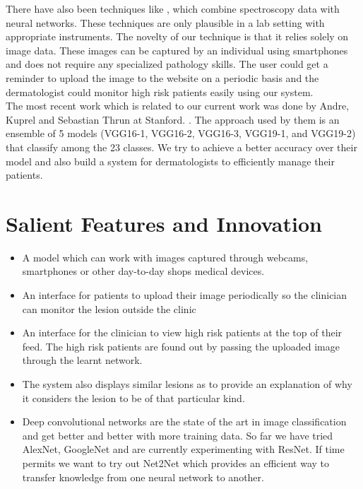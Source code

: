 \documentclass[a4paper,10pt]{article}
\begin{document}
There have also been techniques like \cite{Gniadecka2004443}, \cite{Zhao:15} which combine spectroscopy data with neural networks. These techniques
are only plausible in a lab setting with appropriate instruments. The novelty of our technique is that it relies solely on image data.
These images can be captured by an individual using smartphones and does not require any specialized pathology skills. The user could get a reminder
to upload the image to the website on a periodic basis and the dermatologist could monitor high risk patients easily using our system.\\
The most recent work which is related to our current work was done by Andre, Kuprel and Sebastian Thrun at Stanford. \cite{esteva-skincancer-manuscript}.
The approach used by them is an ensemble of 5 models (VGG16-1, VGG16-2, VGG16-3, VGG19-1, and VGG19-2) that classify among the 23 classes. We try to
achieve a better accuracy over their model and also build a system for dermatologists to efficiently manage their patients.

\section{Salient Features and Innovation}
\begin{itemize}
 \item A model which can work with images captured through webcams, smartphones or other day-to-day shops medical devices.
 \item An interface for patients to upload their image periodically so the clinician can monitor the lesion outside the clinic
 \item An interface for the clinician to view high risk patients at the top of their feed. The high risk patients are found out by passing the
       uploaded image through the learnt network.
 \item The system also displays similar lesions as to provide an explanation of why it considers the lesion to be of that particular kind.
 \item Deep convolutional networks are the state of the art in image classification and get better and better with more training data. So
 far we have tried AlexNet\cite{NIPS2012_4824}, GoogleNet\cite{43022} and are currently experimenting with ResNet\cite{DBLP:journals/corr/HeZRS15}.
 If time permits we want to try out Net2Net \cite{DBLP:journals/corr/ChenGS15} which provides an efficient way to transfer knowledge from one neural
 network to another.
\end{itemize}
\end{document}
